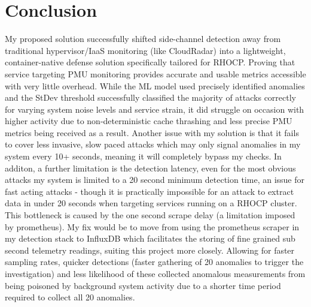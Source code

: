 \documentclass[11pt,a4paper, notitlepage]{article}
\begin{document}
\section{Conclusion}
My proposed solution successfully shifted side-channel detection away from traditional hypervisor/IaaS monitoring (like CloudRadar) into a lightweight, 
container-native defense solution specifically tailored for RHOCP. Proving that service targeting PMU monitoring provides accurate and usable metrics
accessible with very little overhead. 
While the ML model used precisely identified anomalies and the StDev threshold successfully classified the 
majority of attacks correctly for varying system noise levels and service strain, it did struggle on occasion with higher activity due to non-deterministic 
cache thrashing and less precise PMU metrics being received as a result. Another issue with my solution is that it fails to cover less invasive, slow paced
attacks which may only signal anomalies in my system every 10+ seconds, meaning it will completely bypass my checks. In additon, a further limitation is the 
detection latency, even for the most obvious attacks my system is limited to a 20 second minimum detection time, an issue for fast acting attacks - though it is practically
impossible for an attack to extract data in under 20 seconds when targeting services running on a RHOCP cluster.
This bottleneck is caused by the one second scrape delay (a limitation imposed by prometheus). My fix would be to move from using the prometheus scraper in my 
detection stack to InfluxDB which facilitates the storing of fine grained sub second telemetry readings, suiting this project more closely. Allowing for 
faster sampling rates, quicker detections (faster gathering of 20 anomalies to trigger the investigation) and less likelihood of these collected anomalous measurements
from being poisoned by background system activity due to a shorter time period required to collect all 20 anomalies.
\end{document}
